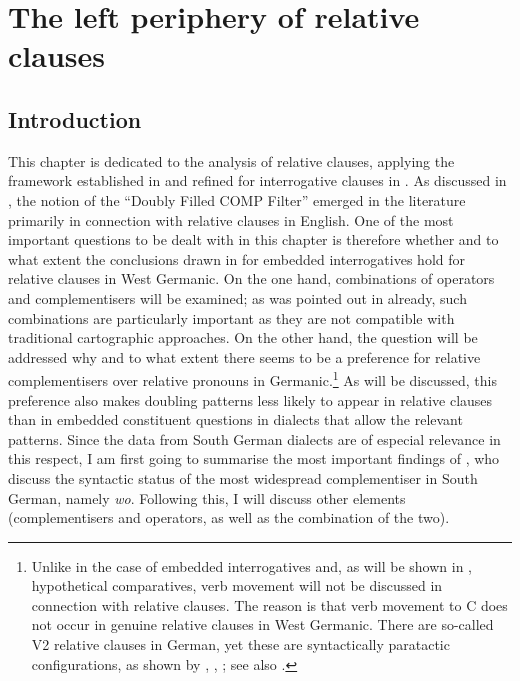 \chapter{The left periphery of relative clauses} \label{ch:4}
\section{Introduction} \label{sec:4introduction}
This chapter is dedicated to the analysis of relative clauses, applying the framework established in  and refined for interrogative clauses in . As discussed in , the notion of the ``Doubly Filled COMP Filter'' emerged in the literature primarily in connection with relative clauses in English. One of the most important questions to be dealt with in this chapter is therefore whether and to what extent the conclusions drawn in  for embedded interrogatives hold for relative clauses in West Germanic. On the one hand, combinations of operators and complementisers will be examined; as was pointed out in  already, such combinations are particularly important as they are not compatible with traditional cartographic approaches. On the other hand, the question will be addressed why and to what extent there seems to be a preference for relative complementisers over relative pronouns in Germanic.\footnote{Unlike in the case of embedded interrogatives and, as will be shown in , hypothetical comparatives, verb movement will not be discussed in connection with relative clauses. The reason is that verb movement to C does not occur in genuine relative clauses in West Germanic. There are so-called V2 relative clauses in German, yet these are syntactically paratactic configurations, as shown by \citet{gaertner1998, gaertner2001}, \citet{endrissgaertner2005}, \citet{ebertendrissgaertner2007}; see also \citet[144--150]{coniglio2019}.} As will be discussed, this preference also makes doubling patterns less likely to appear in relative clauses than in embedded constituent questions in dialects that allow the relevant patterns. Since the data from South German dialects are of especial relevance in this respect, I am first going to summarise the most important findings of \citet{brandnerbraeuning2013}, who discuss the syntactic status of the most widespread complementiser in South German, namely \textit{wo}. Following this, I will discuss other elements (complementisers and operators, as well as the combination of the two).

